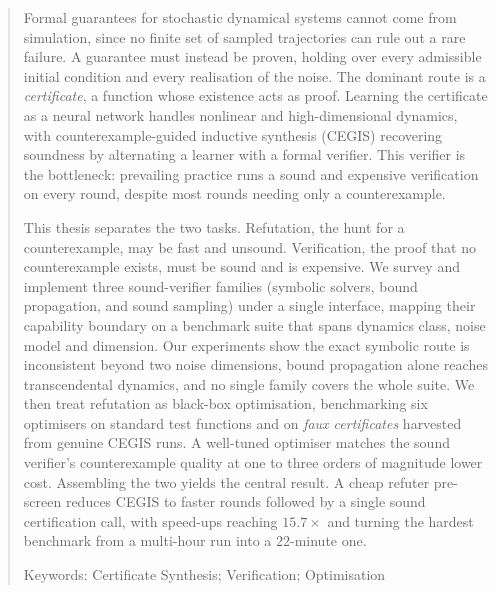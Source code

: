 
\begin{abstract}

Formal guarantees for stochastic dynamical systems cannot come from simulation, since no finite set of sampled trajectories can rule out a rare failure. A guarantee must instead be proven, holding over every admissible initial condition and every realisation of the noise. The dominant route is a \emph{certificate}, a function whose existence acts as proof. Learning the certificate as a neural network handles nonlinear and high-dimensional dynamics, with counterexample-guided inductive synthesis (CEGIS) recovering soundness by alternating a learner with a formal verifier. This verifier is the bottleneck: prevailing practice runs a sound and expensive verification on every round, despite most rounds needing only a counterexample.

This thesis separates the two tasks. Refutation, the hunt for a counterexample, may be fast and unsound. Verification, the proof that no counterexample exists, must be sound and is expensive. We survey and implement three sound-verifier families (symbolic solvers, bound propagation, and sound sampling) under a single interface, mapping their capability boundary on a benchmark suite that spans dynamics class, noise model and dimension. Our experiments show the exact symbolic route is inconsistent beyond two noise dimensions, bound propagation alone reaches transcendental dynamics, and no single family covers the whole suite. We then treat refutation as black-box optimisation, benchmarking six optimisers on standard test functions and on \emph{faux certificates} harvested from genuine CEGIS runs. A well-tuned optimiser matches the sound verifier's counterexample quality at one to three orders of magnitude lower cost. Assembling the two yields the central result. A cheap refuter pre-screen reduces CEGIS to faster rounds followed by a single sound certification call, with speed-ups reaching $15.7\times$ and turning the hardest benchmark from a multi-hour run into a $22$-minute one.

\bigskip
Keywords: Certificate Synthesis; Verification; Optimisation


\newpage
\end{abstract}
